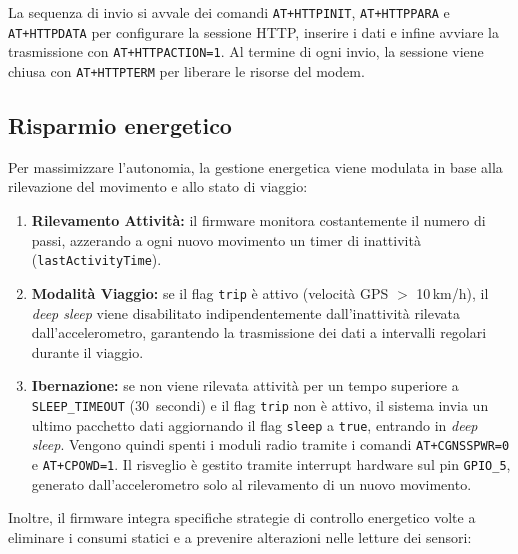 \documentclass[12pt,a4paper]{article}
\begin{document}
La sequenza di invio si avvale dei comandi \texttt{AT+HTTPINIT}, \texttt{AT+HTTPPARA}
e \texttt{AT+HTTPDATA} per configurare la sessione HTTP, inserire i dati e infine avviare
la trasmissione con \texttt{AT+HTTPACTION=1}. Al termine di ogni invio, la sessione viene
chiusa con \texttt{AT+HTTPTERM} per liberare le risorse del modem.

\subsection{Risparmio energetico}

Per massimizzare l'autonomia, la gestione energetica 
viene modulata in base alla rilevazione del movimento e allo stato di viaggio:

\begin{enumerate}
    \item \textbf{Rilevamento Attività:} il firmware monitora costantemente il numero di passi,
          azzerando a ogni nuovo movimento un timer di inattività (\texttt{lastActivityTime}).
    \item \textbf{Modalità Viaggio:} se il flag \texttt{trip} è attivo (velocità GPS $>$ 10\,km/h), 
          il \textit{deep sleep} viene disabilitato indipendentemente dall'inattività rilevata
          dall'accelerometro, garantendo la trasmissione dei dati a intervalli regolari durante il viaggio.
    \item \textbf{Ibernazione:} se non viene rilevata attività per un tempo superiore a
          \texttt{SLEEP\_TIMEOUT} (30~secondi) e il flag \texttt{trip} non è attivo, il sistema
          invia un ultimo pacchetto dati aggiornando il flag \texttt{sleep} a \texttt{true}, entrando in \textit{deep sleep}. 
          Vengono quindi spenti i moduli radio tramite i comandi \texttt{AT+CGNSSPWR=0} e \texttt{AT+CPOWD=1}. Il risveglio
          è gestito tramite interrupt hardware sul pin \texttt{GPIO\_5}, generato dall'accelerometro
          solo al rilevamento di un nuovo movimento.
\end{enumerate}

Inoltre, il firmware integra specifiche strategie di controllo energetico 
volte a eliminare i consumi statici e a prevenire alterazioni nelle letture dei sensori:
\end{document}
